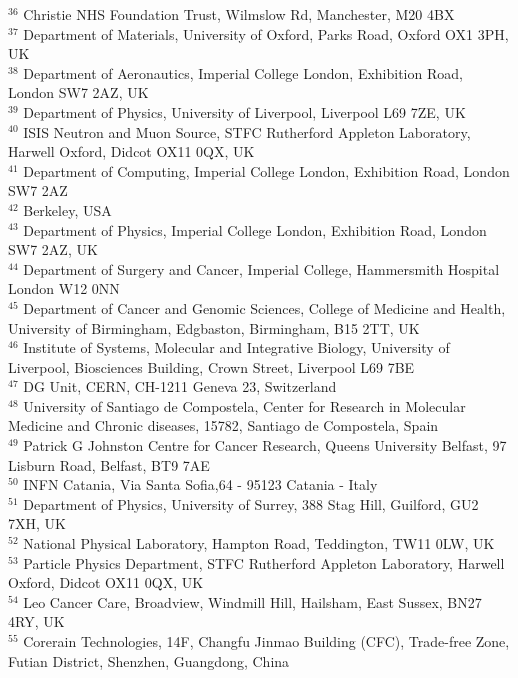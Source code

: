 {\begin{tabbing}
     $^{36}$ \> Christie NHS Foundation Trust, Wilmslow Rd, Manchester, M20 4BX\\
     $^{37}$ \> Department of Materials, University of Oxford, Parks Road, Oxford OX1 3PH, UK\\
     $^{38}$ \> Department of Aeronautics, Imperial College London, Exhibition Road, London SW7 2AZ, UK\\
     $^{39}$ \> Department of Physics, University of Liverpool, Liverpool L69 7ZE, UK\\
     $^{40}$ \> ISIS Neutron and Muon Source, STFC Rutherford Appleton Laboratory, Harwell Oxford, Didcot OX11 0QX, UK\\
     $^{41}$ \> Department of Computing, Imperial College London, Exhibition Road, London SW7 2AZ\\
     $^{42}$ \> Berkeley, USA\\
     $^{43}$ \> Department of Physics, Imperial College London, Exhibition Road, London SW7 2AZ, UK\\
     $^{44}$ \> Department of Surgery and Cancer, Imperial College, Hammersmith Hospital London W12 0NN\\
     $^{45}$ \> Department of Cancer and Genomic Sciences, College of Medicine and Health, University of Birmingham, Edgbaston, Birmingham, B15 2TT, UK\\
     $^{46}$ \> Institute of Systems, Molecular and Integrative Biology, University of Liverpool, Biosciences Building, Crown Street, Liverpool L69 7BE\\
     $^{47}$ \> DG Unit, CERN, CH-1211 Geneva 23, Switzerland\\
     $^{48}$ \> University of Santiago de Compostela, Center for Research in Molecular Medicine and Chronic diseases, 15782, Santiago de Compostela, Spain\\
     $^{49}$ \> Patrick G Johnston Centre for Cancer Research, Queens University Belfast, 97 Lisburn Road, Belfast, BT9 7AE\\
     $^{50}$ \> INFN Catania, Via Santa Sofia,64 - 95123 Catania - Italy\\
     $^{51}$ \> Department of Physics, University of Surrey, 388 Stag Hill, Guilford, GU2 7XH, UK\\
     $^{52}$ \> National Physical Laboratory, Hampton Road, Teddington, TW11 0LW, UK\\
     $^{53}$ \> Particle Physics Department, STFC Rutherford Appleton Laboratory, Harwell Oxford, Didcot OX11 0QX, UK\\
     $^{54}$ \> Leo Cancer Care, Broadview, Windmill Hill, Hailsham, East Sussex, BN27 4RY, UK\\
     $^{55}$ \> Corerain Technologies, 14F, Changfu Jinmao Building (CFC), Trade-free Zone, Futian District, Shenzhen, Guangdong, China\\
    ~   \> \\
  \end{tabbing}
}
